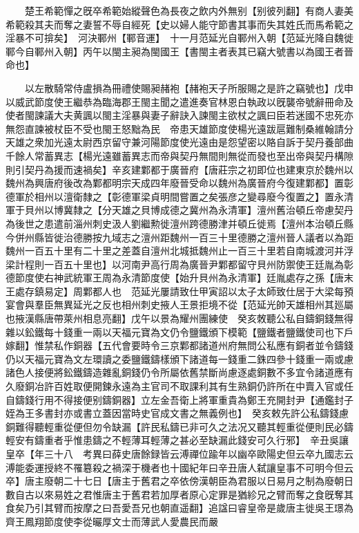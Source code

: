 　　楚王希範憚之旣卒希範始縱聲色為長夜之飲内外無别【别彼列翻】有商人妻美希範殺其夫而奪之妻誓不辱自經死【史以婦人能守節書其事而失其姓氏而馬希範之淫暴不可揜矣】　河決鄆州【鄆音運】　十一月范延光自鄆州入朝【范延光降自魏徙鄆今自鄆州入朝】丙午以閩主昶為閩國王【書閩主者表其已竊大號書以為國王者晉命也】

　　以左散騎常侍盧損為冊禮使賜昶赭袍【赭袍天子所服賜之是許之竊號也】戊申以威武節度使王繼恭為臨海郡王閩主聞之遣進奏官林恩白執政以旣襲帝號辭冊命及使者閩諫議大夫黄諷以閩主淫暴與妻子辭訣入諫閩主欲杖之諷曰臣若迷國不忠死亦無怨直諫被杖臣不受也閩王怒黜為民　帝患天雄節度使楊光遠跋扈難制桑維翰請分天雄之衆加光遠太尉西京留守兼河陽節度使光遠由是怨望密以賂自訴于契丹養部曲千餘人常蓄異志【楊光遠雖蓄異志而帝與契丹無間則無從而發也至出帝與契丹構隙則引契丹為援而速禍矣】辛亥建鄴都于廣晉府【唐莊宗之初即位也建東京於魏州以魏州為興唐府後改為鄴都明宗天成四年廢晉受命以魏州為廣晉府今復建鄴都】置彰德軍於相州以澶衛隸之【彰德軍梁貞明間嘗置之矣張彦之變尋廢今復置之】置永清軍于貝州以博冀隸之【分天雄之貝博成德之冀州為永清軍】澶州舊治頓丘帝慮契丹為後世之患遣前淄州刺史汲人劉繼勲徙澶州跨德勝津并頓丘徙焉【澶州本治頓丘縣今併州縣皆徙治德勝按九域志之澶州距魏州一百三十里德勝之澶州晉人議者以為距魏州一百五十里有二十里之差蓋自澶州北城抵魏州止一百三十里若自南城渡河并浮梁計程則一百五十里也】以河南尹高行周為廣晉尹鄴都留守貝州防禦使王廷胤為彰德節度使右神武統軍王周為永清節度使【始升貝州為永清軍】廷胤處存之孫【唐末王處存鎮易定】周鄴都人也　范延光屢請致仕甲寅詔以太子太師致仕居于大梁每預宴會與羣臣無異延光之反也相州刺史掖人王景拒境不從【范延光帥天雄相州其廵屬也掖漢縣唐帶萊州相息亮翻】戊午以景為耀州團練使　癸亥敇聽公私自鑄銅錢無得雜以鈆鐵每十錢重一兩以天福元寶為文仍令鹽鐵頒下模範【鹽鐵者鹽鐵使司也下戶嫁翻】惟禁私作銅器【五代會要時令三京鄴都諸道州府無問公私應有銅者並令鑄錢仍以天福元寶為文左環讀之委鹽鐵鑄樣頒下諸道每一錢重二銖四參十錢重一兩或慮諸色人接便將鈆鐵鑄造雜亂銅錢仍令所屬依舊禁斷尚慮逐處銅數不多宜令諸道應有久廢銅冶許百姓取便開鍊永遠為主官司不取課利其有生熟銅仍許所在中賣入官或任自鑄錢行用不得接便别鑄銅器】立左金吾衛上將軍重貴為鄭王充開封尹【通鑑封子姪為王多書封亦或書立蓋因當時史官成文書之無義例也】　癸亥敕先許公私鑄錢慮銅難得聽輕重從便但勿令缺漏【許民私鑄已非可久之法况又聽其輕重從便則民必鑄輕安有鑄重者乎惟患鑄之不輕薄耳輕薄之甚必至缺漏此錢安可久行邪】　辛丑吳讓皇卒【年三十八　考異曰薛史唐餘録皆云溥禪位踰年以幽卒歐陽史但云卒九國志云溥能委運授終不罹簒殺之禍深于機者也十國紀年曰辛丑唐人弑讓皇事不可明今但云卒】唐主廢朝二十七日【唐主于舊君之卒依傍漢朝臣為君服以日易月之制為廢朝日數自古以來易姓之君惟唐主于舊君若加厚者原心定罪是猶紾兄之臂而奪之食旣奪其食矣乃引其臂而按摩之曰吾愛吾兄也朝直遥翻】追諡曰睿皇帝是歲唐主徙吳王璟為齊王鳳翔節度使李從曮厚文士而薄武人愛農民而嚴

